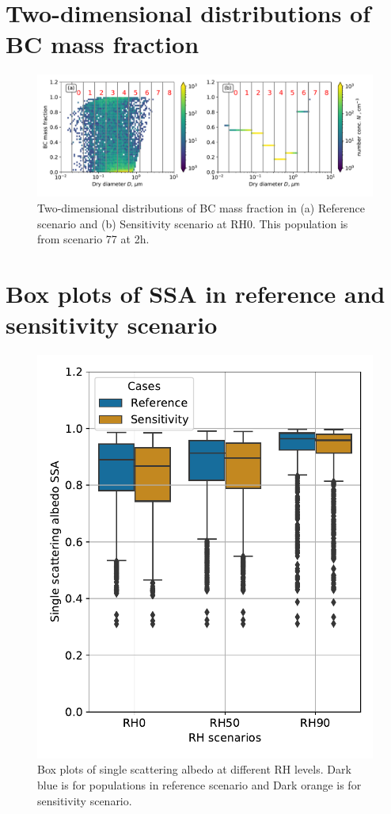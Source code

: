 \documentclass[edeposit,fullpage]{uiucthesis2009}
\begin{document}
\section{Two-dimensional distributions of BC mass fraction}    %
\begin{figure}[H]
	\centering
	\includegraphics[scale=0.50]{chap4_figs/fig_sup3.pdf}
	\caption{Two-dimensional distributions of BC mass fraction in (a) Reference scenario and (b) Sensitivity scenario at RH0. 
	 This population is from scenario 77 at 2h.}
	\label{fig_sup3}
\end{figure}

\section{Box plots of SSA in reference and sensitivity scenario}    %
\begin{figure}[H]
	\centering
	\includegraphics[scale=0.50]{chap4_figs/fig_sup4.pdf}
	\caption{Box plots of single scattering albedo at different RH levels. Dark blue is for populations
	in reference scenario and Dark orange is for sensitivity scenario.}
	\label{fig_sup4}
\end{figure}

\backmatter
\renewcommand{\bibname}{References}


\end{document}
